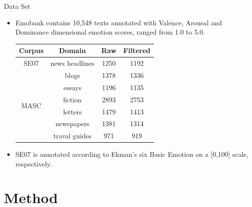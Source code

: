 \documentclass[
 size=14pt,
 paper=smartboard,  %
 mode=present, 		%
 display=slides, 	%
 style=tuliplab,  	%
 pauseslide,
 fleqn,leqno]{powerdot}
\begin{document}
\begin{slide}[toc=,bm=]{Data Set}
	
	\begin{itemize}
		\item
		Emobank contains 10,548 texts annotated with
		Valence, Arousal and Dominance 
		dimensional emotion scores, 
		ranged from 1.0 to 5.0.
		\begin{center}
			\begin{tabular}{ c c c c }
				\toprule
				Corpus & Domain  & Raw & Filtered  \\
				\midrule
				SE07 &  news headlines &  1250 &  1192 \\
				\hline
				\multirow{6}{*}{MASC} &  blogs&  1378&  1336\\
				&  essays &  1196 &  1135 \\
				&  fiction &  2893 &  2753 \\
				&  letters &  1479 &  1413 \\
				& newspapers & 1381 & 1314 \\
				& traval guides & 971 & 919 \\
				\bottomrule
			\end{tabular}
		\end{center}
		
		\item 
		SE07 is  annotated according to 
		Ekman’s six Basic Emotion 
		on a [0,100] scale, respectively.
		
	\end{itemize}
	
\end{slide}



\section{Method}
\end{document}
